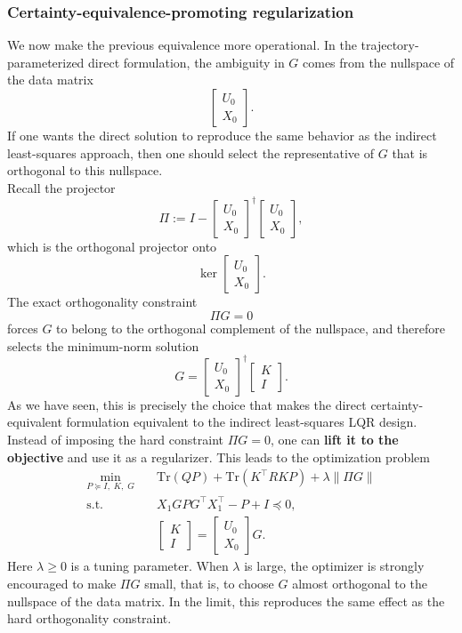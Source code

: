 \subsubsection{Certainty-equivalence-promoting regularization}

We now make the previous equivalence more operational. In the trajectory-parameterized direct
formulation, the ambiguity in $G$ comes from the nullspace of the data matrix
\[
\begin{bmatrix}
U_0\\[0.3em]
X_0
\end{bmatrix}.
\]
If one wants the direct solution to reproduce the same behavior as the indirect least-squares
approach, then one should select the representative of $G$ that is orthogonal to this nullspace.\\
Recall the projector
\[
\Pi := I -
\begin{bmatrix}
U_0\\[0.3em]
X_0
\end{bmatrix}^{\dagger}
\begin{bmatrix}
U_0\\[0.3em]
X_0
\end{bmatrix},
\]
which is the orthogonal projector onto
\[
\ker\!\begin{bmatrix}
U_0\\[0.3em]
X_0
\end{bmatrix}.
\]
The exact orthogonality constraint
\[
\Pi G = 0
\]
forces $G$ to belong to the orthogonal complement of the nullspace, and therefore selects the
minimum-norm solution
\[
G =
\begin{bmatrix}
U_0\\[0.3em]
X_0
\end{bmatrix}^{\dagger}
\begin{bmatrix}
K\\[0.3em]
I
\end{bmatrix}.
\]
As we have seen, this is precisely the choice that makes the direct certainty-equivalent
formulation equivalent to the indirect least-squares LQR design.\\
Instead of imposing the hard constraint $\Pi G=0$, one can \textbf{lift it to the objective} and use
it as a regularizer. This leads to the optimization problem
\[
\begin{aligned}
\min_{P \succeq I,\;K,\;G}\quad
& \text{Tr}(QP)+\text{Tr}(K^\top RKP)+\lambda \|\Pi G\| \\
\text{s.t.}\quad
& X_1GPG^\top X_1^\top - P + I \preceq 0,\\
& \begin{bmatrix}
K\\[0.3em]
I
\end{bmatrix}
=
\begin{bmatrix}
U_0\\[0.3em]
X_0
\end{bmatrix}G.
\end{aligned}
\]
Here $\lambda \ge 0$ is a tuning parameter. When $\lambda$ is large, the optimizer is strongly
encouraged to make $\Pi G$ small, that is, to choose $G$ almost orthogonal to the nullspace of
the data matrix. In the limit, this reproduces the same effect as the hard orthogonality
constraint.\\

